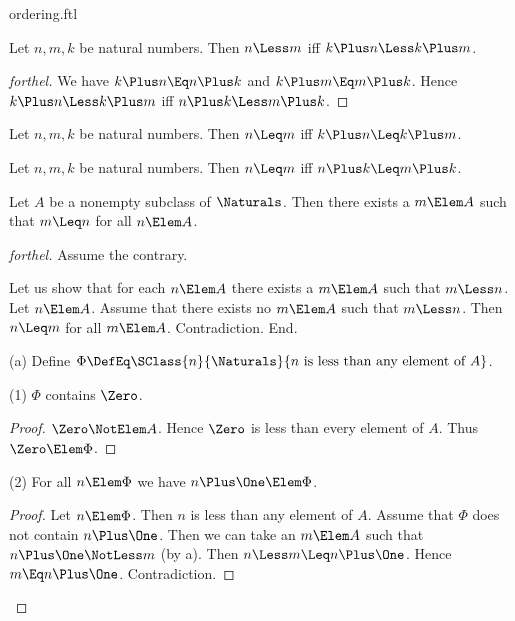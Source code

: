 \documentclass{stex}
\begin{document}
\begin{smodule}{ordering.ftl}
\begin{proposition*}[forthel]
  Let $n, m, k$ be natural numbers.
  Then $n \Less m$ iff $k \Plus n \Less k \Plus m$.
\end{proposition*}
\begin{proof}[forthel]
  We have $k \Plus n \Eq n \Plus k$ and $k \Plus m \Eq m \Plus k$.
  Hence $k \Plus n \Less k \Plus m$ iff $n \Plus k \Less m \Plus k$.
\end{proof}

\begin{proposition*}[forthel]
  Let $n, m, k$ be natural numbers.
  Then $n \Leq m$ iff $k \Plus n \Leq k \Plus m$.
\end{proposition*}

\begin{proposition*}[forthel]
  Let $n, m, k$ be natural numbers.
  Then $n \Leq m$ iff $n \Plus k \Leq m \Plus k$.
\end{proposition*}

\begin{proposition*}[forthel,name=wellfoundedness of ordering]
  Let $A$ be a nonempty subclass of $\Naturals$.
  Then there exists a $m \Elem A$ such that $m \Leq n$ for all $n \Elem A$.
\end{proposition*}
\begin{proof}[forthel]
  Assume the contrary.

  Let us show that for each $n \Elem A$ there exists a $m \Elem A$ such that $m \Less n$.
    Let $n \Elem A$.
    Assume that there exists no $m \Elem A$ such that $m \Less n$.
    Then $n \Leq m$ for all $m \Elem A$.
    Contradiction.
  End.

  (a) Define $\Phi \DefEq \SClass{n}{\Naturals}{n\text{ is less than any element of }A}$.

  (1) $\Phi$ contains $\Zero$.
  \begin{proof}
    $\Zero \NotElem A$.
    Hence $\Zero$ is less than every element of $A$.
    Thus $\Zero \Elem \Phi$.
  \end{proof}

  (2) For all $n \Elem \Phi$ we have $n \Plus \One \Elem \Phi$.
  \begin{proof}
    Let $n \Elem \Phi$.
    Then $n$ is less than any element of $A$.
    Assume that $\Phi$ does not contain $n \Plus \One$.
    Then we can take an $m \Elem A$ such that $n \Plus \One \NotLess m$ (by a).
    Then $n \Less m \Leq n \Plus \One$.
    Hence $m \Eq n \Plus \One$.
    Contradiction.
  \end{proof}


\end{proof}
\end{smodule}
\end{document}
